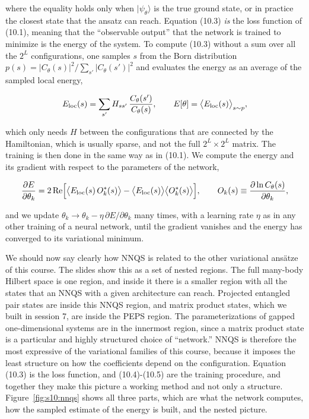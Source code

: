 where the equality holds only when $|\psi_\theta\rangle$ is the true ground state, or in practice
the closest state that the ansatz can reach. Equation (10.3) \emph{is} the loss function of (10.1),
meaning that the ``observable output'' that the network is trained to minimize is the energy of
the system. To compute (10.3) without a sum over all the $2^L$ configurations, one samples $s$ from
the Born distribution $p(s) = |C_\theta(s)|^2/\sum_{s'}|C_\theta(s')|^2$ and evaluates the energy
as an average of the sampled local energy,

\begin{equation}
E_{\rm loc}(s) = \sum_{s'} H_{s s'}\, \frac{C_\theta(s')}{C_\theta(s)}, \qquad E[\theta] = \big\langle E_{\rm loc}(s)\big\rangle_{s\sim p},
\end{equation}

which only needs $H$ between the configurations that are connected by the Hamiltonian, which is
usually sparse, and not the full $2^L\times 2^L$ matrix. The training is then done in the same way
as in (10.1). We compute the energy and its gradient with respect to the parameters of the network,

\begin{equation}
\frac{\partial E}{\partial \theta_k} = 2\,\mathrm{Re}\Big[\big\langle E_{\rm loc}(s)\, O_k^*(s)\big\rangle - \big\langle E_{\rm loc}(s)\big\rangle\big\langle O_k^*(s)\big\rangle\Big], \qquad O_k(s) \equiv \frac{\partial \ln C_\theta(s)}{\partial \theta_k},
\end{equation}

and we update $\theta_k \to \theta_k - \eta\, \partial E/\partial\theta_k$ many times, with a
learning rate $\eta$ as in any other training of a neural network, until the gradient vanishes and
the energy has converged to its variational minimum.

We should now say clearly how NNQS is related to the other variational ans\"atze of this course.
The slides show this as a set of nested regions. The full many-body Hilbert space is one region,
and inside it there is a smaller region with all the states that an NNQS with a given architecture
can reach. Projected entangled pair states are inside this NNQS region, and matrix product states,
which we built in session 7, are inside the PEPS region. The parameterizations of gapped
one-dimensional systems are in the innermost region, since a matrix product state is a particular
and highly structured choice of ``network.'' NNQS is therefore the most expressive of the
variational families of this course, because it imposes the least structure on how the
coefficients depend on the configuration. Equation (10.3) is the loss function, and (10.4)-(10.5)
are the training procedure, and together they make this picture a working method and not only a
structure. Figure~\ref{fig:s10:nnqs} shows all three parts, which are what the network computes,
how the sampled estimate of the energy is built, and the nested picture.

